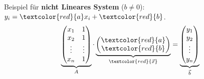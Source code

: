 \noindent
Beispiel für \textbf{nicht Lineares System} ($b\neq0$): $y_i = \textcolor{red}{a}x_i + \textcolor{red}{b}$.
\[
\underbrace{\begin{pmatrix}
		x_1 & 1 \\
		x_2 & 1 \\
		\vdots & \vdots \\
		x_n & 1
\end{pmatrix}}_{\scriptsize{A}}
\cdot
\underbrace{\begin{pmatrix}
		\textcolor{red}{a} \\
		\textcolor{red}{b}
\end{pmatrix}}_{\scriptsize{\textcolor{red}{\vec{x}}}}
=
\underbrace{\begin{pmatrix}
		y_1 \\
		y_2 \\
		\vdots \\
		y_n
\end{pmatrix}}_{\scriptsize{\vec{b}}}
\]
